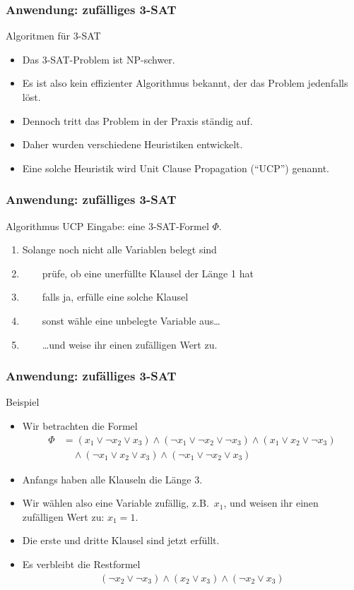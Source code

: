 \documentclass{beamer}
\newcommand\bc[1]{\left({#1}\right)}
\newcommand{\mytitle}{Anwendung: zuf\"alliges 3-SAT}
\begin{document}
\begin{frame}\frametitle{\mytitle}
	\begin{block}{Algoritmen f\"ur 3-SAT}
		\begin{itemize}
			\item Das 3-SAT-Problem ist \alert{NP-schwer}.
			\item Es ist also kein effizienter Algorithmus bekannt, der das Problem jedenfalls l\"ost.
			\item Dennoch tritt das Problem in der Praxis st\"andig auf.
			\item Daher wurden verschiedene Heuristiken entwickelt.
			\item Eine solche Heuristik wird \alert{Unit Clause Propagation} (``UCP'') genannt.
		\end{itemize}
	\end{block}
\end{frame}

\begin{frame}\frametitle{\mytitle}
	\begin{block}{Algorithmus UCP}
		\alert{Eingabe:} eine 3-SAT-Formel $\Phi$.
		\begin{enumerate}
			\item Solange noch nicht alle Variablen belegt sind
			\item $\qquad$pr\"ufe, ob eine unerf\"ullte Klausel der L\"ange 1 hat
			\item $\qquad$falls ja, erf\"ulle eine solche Klausel
			\item $\qquad$sonst w\"ahle eine unbelegte Variable aus\dots 
			\item $\qquad$\dots und weise ihr einen zuf\"alligen Wert zu.
		\end{enumerate}
	\end{block}
\end{frame}

\begin{frame}\frametitle{\mytitle}
	\begin{block}{Beispiel}
		\begin{itemize}
			\item Wir betrachten die Formel
				\begin{align*}
					\Phi&=\bc{x_1\vee\neg x_2\vee x_3}\wedge\bc{\neg x_1\vee\neg x_2\vee\neg x_3}\wedge\bc{x_1\vee x_2\vee\neg x_3}\\&\quad\wedge\bc{\neg x_1\vee x_2\vee x_3}\wedge\bc{\neg x_1\vee \neg x_2\vee x_3}
				\end{align*}
			\item Anfangs haben alle Klauseln die L\"ange 3.
			\item Wir w\"ahlen also eine Variable zuf\"allig, z.B.\ $x_1$, und weisen ihr einen zuf\"alligen Wert zu: $x_1=1$.
			\item Die erste und dritte Klausel sind jetzt erf\"ullt.
			\item Es verbleibt die Restformel
				\begin{align*}
					\bc{\neg x_2\vee\neg x_3}\wedge\bc{x_2\vee x_3}\wedge\bc{\neg x_2\vee x_3}
				\end{align*}
		\end{itemize}
	\end{block}
\end{frame}
\end{document}
